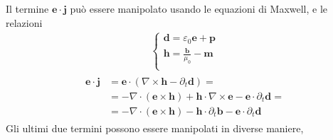 \documentclass[letterpaper,10pt,italian]{jupyterBook}
\begin{document}
\sphinxAtStartPar
Il termine \(\mathbf{e} \cdot \mathbf{j}\) può essere manipolato usando le equazioni di Maxwell, e le relazioni
\begin{equation*}
\begin{split}\begin{cases}
  \mathbf{d} = \varepsilon_0 \mathbf{e} + \mathbf{p} \\
  \mathbf{h} = \frac{\mathbf{b}}{\mu_0} - \mathbf{m} \\
\end{cases}\end{split}
\end{equation*}\begin{equation*}
\begin{split}\begin{aligned}
  \mathbf{e} \cdot \mathbf{j} 
    & = \mathbf{e} \cdot \left( \nabla \times \mathbf{h} - \partial_t \mathbf{d} \right) = \\
    & = - \nabla \cdot \left( \mathbf{e} \times \mathbf{h} \right) + \mathbf{h} \cdot \nabla \times \mathbf{e} - \mathbf{e} \cdot \partial_t \mathbf{d} = \\
    & = - \nabla \cdot \left( \mathbf{e} \times \mathbf{h} \right) - \mathbf{h} \cdot \partial_t \mathbf{b} - \mathbf{e} \cdot \partial_t \mathbf{d} 
\end{aligned}\end{split}
\end{equation*}
\sphinxAtStartPar
Gli ultimi due termini possono essere manipolati in diverse maniere,
\end{document}
